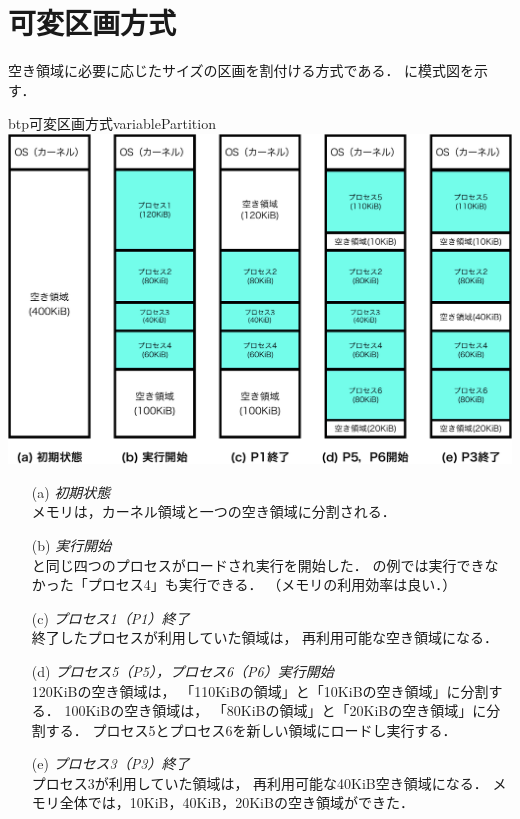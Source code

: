 \section{可変区画方式}
空き領域に必要に応じたサイズの区画を割付ける方式である．
に模式図を示す．

\begin{myfig}{btp}{可変区画方式}{variablePartition}
  \includegraphics[scale=0.6]{Fig/variablePartition-crop.pdf}
\end{myfig}

\begin{enumerate}
\item[(a)] \emph{初期状態} \\
  メモリは，カーネル領域と一つの空き領域に分割される．
\item[(b)] \emph{実行開始} \\
  と同じ四つのプロセスがロードされ実行を開始した．
  の例では実行できなかった「プロセス4」も実行できる．
         （メモリの利用効率は良い．）
\item[(c)] \emph{プロセス1（P1）終了} \\
  終了したプロセスが利用していた領域は，
  再利用可能な空き領域になる．
\item[(d)] \emph{プロセス5（P5），プロセス6（P6）実行開始} \\
  120KiBの空き領域は，
  「110KiBの領域」と「10KiBの空き領域」に分割する．
  100KiBの空き領域は，
  「80KiBの領域」と「20KiBの空き領域」に分割する．
  プロセス5とプロセス6を新しい領域にロードし実行する．
\item[(e)] \emph{プロセス3（P3）終了} \\
  プロセス3が利用していた領域は，
  再利用可能な40KiB空き領域になる．
  メモリ全体では，10KiB，40KiB，20KiBの空き領域ができた．
\end{enumerate}

